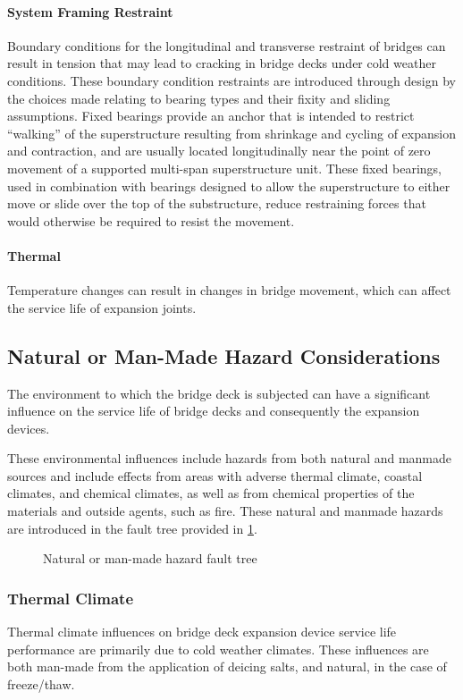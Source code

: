 \paragraph{System Framing Restraint}
Boundary conditions for the longitudinal and transverse restraint of bridges can result in tension that may lead to
cracking in bridge decks under cold weather conditions. These boundary condition restraints are introduced through
design by the choices made relating to bearing types and their fixity and sliding assumptions. Fixed bearings provide
an anchor that is intended to restrict “walking” of the superstructure resulting from shrinkage and cycling of
expansion and contraction, and are usually located longitudinally near the point of zero movement of a supported
multi-span superstructure unit. These fixed bearings, used in combination with bearings designed to allow the
superstructure to either move or slide over the top of the substructure, reduce restraining forces that would otherwise
be required to resist the movement.
\paragraph{Thermal}
Temperature changes can result in changes in bridge movement, which can affect the service life of expansion
joints.

\subsection{Natural or Man-Made Hazard Considerations}
The environment to which the bridge deck is subjected can have a significant influence on the service life of
bridge decks and consequently the expansion devices.

These environmental influences include hazards from both natural and manmade sources and include effects
from areas with adverse thermal climate, coastal climates, and chemical climates, as well as from chemical properties
of the materials and outside agents, such as fire. These natural and manmade hazards are introduced in the fault tree
provided in \cref{fig:faultree-expansion-joint-hazard}.

\begin{figure}
  \caption{Natural or man-made hazard fault tree}
  \label{fig:faultree-expansion-joint-hazard}
\end{figure}
\subsubsection{Thermal Climate}
Thermal climate influences on bridge deck expansion device service life performance are primarily due to cold
weather climates. These influences are both man-made from the application of deicing salts, and natural, in the case
of freeze/thaw.

